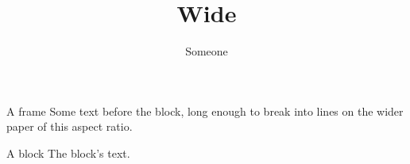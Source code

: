 \documentclass[aspectratio=1610]{beamer}
\title{Wide}
\author{Someone}
\begin{document}
\begin{frame}{A frame}
Some text before the block, long enough to break into lines on the wider paper of this aspect ratio.
\begin{block}{A block}
The block's text.
\end{block}
\end{frame}
\end{document}
